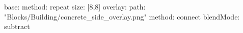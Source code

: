 base:
  method: repeat
  size: [8,8]
overlay:
  path: "Blocks/Building/concrete_side_overlay.png"
  method: connect
  blendMode: subtract